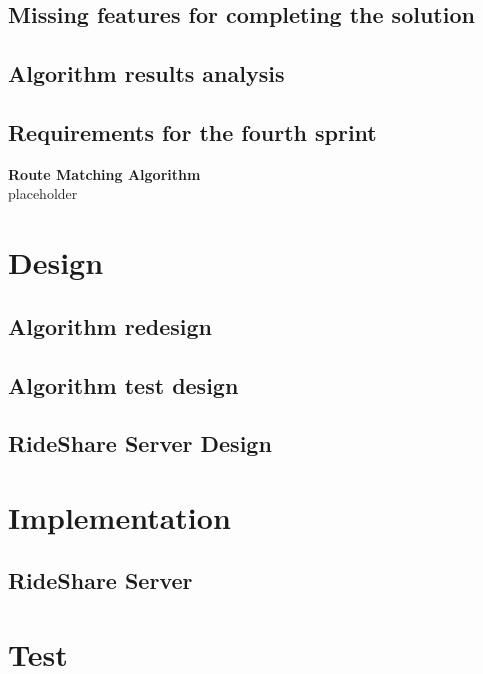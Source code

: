 \subsection{Missing features for completing the solution}

\subsection{Algorithm results analysis}


\subsection{Requirements for the fourth sprint}


\textbf{Route Matching Algorithm}\\
placeholder


\section{Design}


\subsection{Algorithm redesign}


\subsection{Algorithm test design}



\subsection{RideShare Server Design}


\section{Implementation}

\subsection{RideShare Server}






\section{Test}


